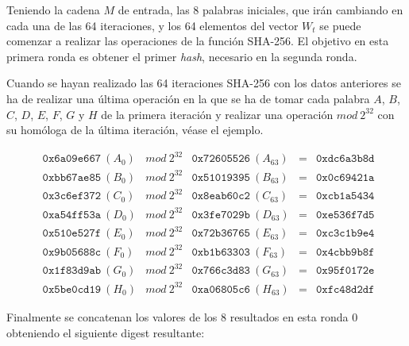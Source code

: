 \documentclass{article}
\begin{document}
        \vspace{1mm}
        
        Teniendo la cadena $M$ de entrada, las 8 palabras iniciales, que irán cambiando en cada una de las 64 iteraciones, y los 64 elementos del vector $W_t$ se puede comenzar a realizar las operaciones de la función SHA-256. El objetivo en esta primera ronda es obtener el primer \textit{hash}, necesario en la segunda ronda.
        
        \vspace{3mm}
        
        Cuando se hayan realizado las 64 iteraciones SHA-256 con los datos anteriores se ha de realizar una última operación en la que se ha de tomar cada palabra $A$, $B$, $C$, $D$, $E$, $F$, $G$ y $H$ de la primera iteración y realizar  una operación $mod\ 2^{32}$ con su homóloga de la última iteración, véase el ejemplo.
        
        \begin{figure}[H]
        \centering
            $\begin{array}{lllll}
                \texttt{0x6a09e667}\ (A_{0}) & mod\ 2^{32} & \texttt{0x72605526}\ (A_{63}) & = & \texttt{0xdc6a3b8d} \\
                \texttt{0xbb67ae85}\ (B_{0}) & mod\ 2^{32} & \texttt{0x51019395}\ (B_{63}) & = & \texttt{0x0c69421a} \\
                \texttt{0x3c6ef372}\ (C_{0}) & mod\ 2^{32} & \texttt{0x8eab60c2}\ (C_{63}) & = & \texttt{0xcb1a5434} \\
                \texttt{0xa54ff53a}\ (D_{0}) & mod\ 2^{32} & \texttt{0x3fe7029b}\ (D_{63}) & = & \texttt{0xe536f7d5} \\
                \texttt{0x510e527f}\ (E_{0}) & mod\ 2^{32} & \texttt{0x72b36765}\ (E_{63}) & = & \texttt{0xc3c1b9e4} \\
                \texttt{0x9b05688c}\ (F_{0}) & mod\ 2^{32} & \texttt{0xb1b63303}\ (F_{63}) & = & \texttt{0x4cbb9b8f} \\
                \texttt{0x1f83d9ab}\ (G_{0}) & mod\ 2^{32} & \texttt{0x766c3d83}\ (G_{63}) & = & \texttt{0x95f0172e} \\
                \texttt{0x5be0cd19}\ (H_{0}) & mod\ 2^{32} & \texttt{0xa06805c6}\ (H_{63}) & = & \texttt{0xfc48d2df}
            \end{array}$
        \end{figure}
        
        Finalmente se concatenan los valores de los 8 resultados en esta ronda 0 obteniendo el siguiente digest resultante:
        
\end{document}
